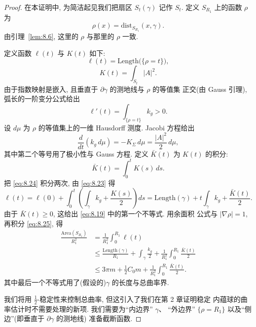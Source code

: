 \begin{proof}
在本证明中, 为简洁起见我们把扇区 $S_t(\gamma)$ 记作 $S_t$. 定义
$S_{R_1}$ 上的函数 $\rho$ 为
\[
\rho(x)=\mathrm{dist}_{S_{R_1}}(x,\gamma).
\]
由引理~\ref{lem:8.6}, 这里的 $\rho$ 与那里的 $\rho$ 一致.

定义函数 $\ell(t)$ 与 $K(t)$ 如下:
\begin{equation}
\ell(t)=\mathrm{Length}\bigl(\{\rho=t\}\bigr),
\label{eq:8.21}
\end{equation}
\begin{equation}
K(t)=\int_{S_t}|A|^2.
\label{eq:8.22}
\end{equation}
由于指数映射是嵌入, 且垂直于 $\partial\gamma$ 的测地线与 $\rho$ 的等值集
正交(由 Gauss 引理), 弧长的一阶变分公式给出
\begin{equation}
\ell'(t)=\int_{\{\rho=t\}}k_g>0.
\label{eq:8.23}
\end{equation}
设 $d\mu$ 为 $\rho$ 的等值集上的一维 Hausdorff 测度. Jacobi 方程给出
\begin{equation}
\frac{d}{dt}(k_g\,d\mu)=-K_\Sigma\,d\mu=\frac{|A|^2}{2}\,d\mu,
\label{eq:8.24}
\end{equation}
其中第二个等号用了极小性与 Gauss 方程. 定义 $\bar K(t)$ 为 $K(t)$ 的积分:
\[
\bar K(t)=\int_0^tK(s)\,ds.
\]
把 \eqref{eq:8.24} 积分两次, 由 \eqref{eq:8.23} 得
\begin{equation}
\ell(t)=\ell(0)+\int_0^t\left(\int_\gamma k_g+\frac{K(s)}2\right)ds
=\mathrm{Length}(\gamma)+t\int_\gamma k_g+\frac{\bar K(t)}2.
\label{eq:8.25}
\end{equation}
由于 $\bar K(t)\geq0$, 这给出 \eqref{eq:8.19} 中的第一个不等式. 用余面积
公式与 $|\nabla\rho|=1$, 再积分 \eqref{eq:8.25}, 得
\begin{equation}
\begin{aligned}
\frac{\mathrm{Area}(S_{R_1})}{R_1^2}
&=\frac1{R_1^2}\int_0^{R_1}\ell(t)\\
&\leq\frac{\mathrm{Length}(\gamma)}{R_1}+\int_\gamma\frac{k_g}2
+\frac1{R_1^2}\int_0^{R_1}\frac{\bar K(t)}2\\
&\leq3\pi m+\frac12C_0m+\frac1{R_1^2}\int_0^{R_1}\frac{\bar K(t)}2.
\label{eq:8.26}
\end{aligned}
\end{equation}
其中最后一个不等式用了(假设的)$\gamma$ 的长度与总曲率界.

我们将用 $\frac12$-稳定性来控制总曲率, 但这引入了我们在第 2 章证明稳定
内蕴球的曲率估计时不需要处理的新项. 我们需要为``内边界'' $\gamma$、
``外边界'' $\{\rho=R_1\}$ 以及``侧边''(即垂直于 $\partial\gamma$ 的测地线)
准备截断函数.


\end{proof}
